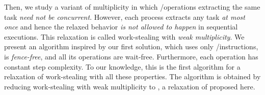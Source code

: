 Then, we study a variant of multiplicity in which \Take/\Steal operations extracting the same task \emph{need not be concurrent}. However, each process extracts any task \emph{at most once} and hence the relaxed behavior \emph{is not allowed to happen} in sequential executions.  This relaxation is called work-stealing with \emph{weak multiplicity}. We present an algorithm inspired by our first solution, which uses only \R/\W instructions, is \emph{fence-free}, and all its operations are wait-free. Furthermore, each operation has constant step complexity. To our knowledge, this is the first algorithm for a relaxation of work-stealing with all these properties. The algorithm is obtained by reducing work-stealing with weak multiplicity to \RangeMaxReg, a relaxation of \MaxReg proposed here.




